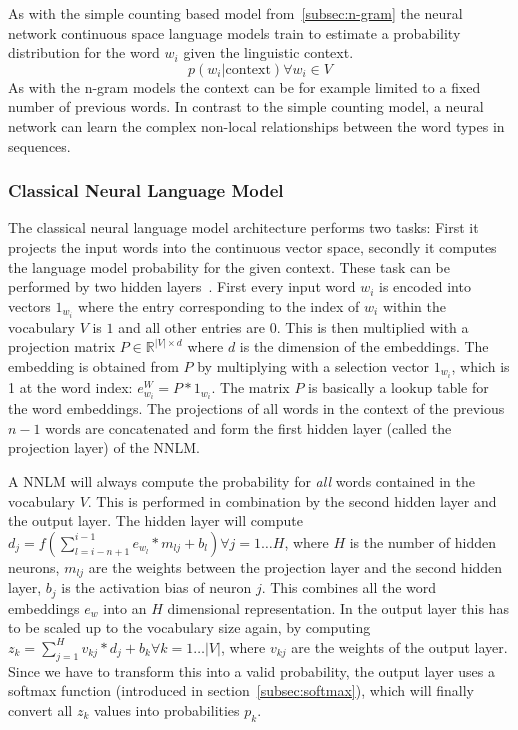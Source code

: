 As with the simple counting based model from~\ref{subsec:n-gram} the neural network continuous space language models train to
estimate a probability distribution for the word $w_i$ given the linguistic context.
\[
    p(w_i|\text{context}) \forall w_i \in V
\]
As with the n-gram models the context can be for example limited to a fixed number of previous words. In contrast to the
simple counting model, a neural network can learn the complex non-local relationships between the word types in sequences.

\subsubsection{Classical Neural Language Model}

The classical neural language model architecture performs two tasks: First it projects the input words into the continuous vector space,
secondly it computes the language model probability for the given context. These task can be performed by two 
hidden layers~\cite{Schwenk:2007:CSL:1230156.1230409}. 
First every input word $w_i$ is encoded into vectors $1_{w_i}$ where
the entry corresponding to the index of $w_i$ within the vocabulary $V$ is $1$ and all other entries are $0$. 
This is then multiplied with a projection matrix $P \in \mathbb{R}^{|V| \times d}$ where $d$ is the dimension of the embeddings.
The embedding is obtained from $P$ by multiplying with a selection vector $1_{w_i}$, 
which is 1 at the word index: $e_{w_i}^W = P * 1_{w_i}$. The matrix $P$ is basically a lookup 
table for the word embeddings. 
The projections of all words in the context of the previous $n-1$ words are concatenated and form 
the first hidden layer (called the projection layer) of the NNLM.

A NNLM will always compute the probability for \textit{all} words contained in the vocabulary $V$. 
This is performed in combination by the second hidden layer and the output layer. 
The hidden layer will compute $d_j = f(\sum_{l = i-n+1}^{i-1} e_{w_l} * m_{lj} + b_l) \forall j = 1 \dots H$, 
where $H$ is the number of hidden neurons, $m_{lj}$ are the weights between the projection layer and the second hidden layer,
$b_j$ is the activation bias of neuron $j$. This combines all the word embeddings $e_w$ into an $H$ dimensional representation.
In the output layer this has to be scaled up to the vocabulary size again, 
by computing $z_k = \sum_{j = 1}^{H} v_{kj} * d_j + b_k \forall k = 1 \dots |V|$, where $v_{kj}$ are the weights of the output layer.
Since we have to transform this into a valid probability, the output layer uses a softmax function 
(introduced in section~\ref{subsec:softmax}), which will finally convert all $z_k$ values into probabilities $p_k$.
 
